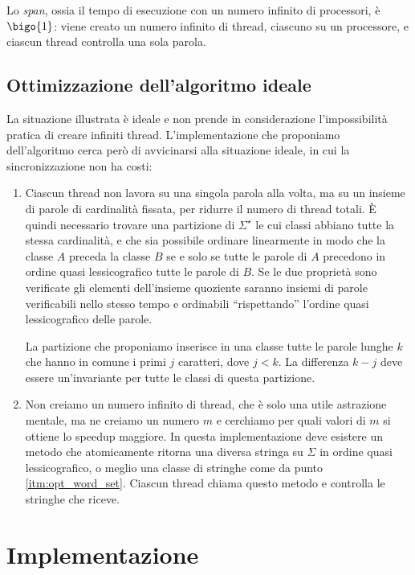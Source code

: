 \documentclass[]{myarticle}
\begin{document}
Lo \emph{span}, ossia il tempo di esecuzione con un numero infinito di processori, \`e $\bigo{1}$: viene creato un numero infinito di thread, ciascuno su un processore, e ciascun thread controlla una sola parola.

\subsection{Ottimizzazione dell'algoritmo ideale}

La situazione illustrata \`e ideale e non prende in considerazione l'impossibilit\`a pratica di creare infiniti thread.
L'implementazione che proponiamo dell'algoritmo cerca per\`o di avvicinarsi alla situazione ideale, in cui la sincronizzazione non ha costi:
\begin{enumerate}
	\item \label{itm:opt_word_set} Ciascun thread non lavora su una singola parola alla volta, ma su un insieme di parole di cardinalit\`a fissata, per ridurre il numero di thread totali.
		\`E quindi necessario trovare una partizione di $\Sigma^{\star}$ le cui classi abbiano tutte la stessa cardinalit\`a, e che sia possibile ordinare linearmente in modo che la classe $A$  preceda la classe $B$  se e solo se tutte le parole di $A$ precedono in ordine quasi lessicografico tutte le parole di $B$.
		Se le due propriet\`a sono verificate gli elementi dell'insieme quoziente saranno insiemi di parole verificabili nello stesso tempo e ordinabili ``rispettando'' l'ordine quasi lessicografico delle parole.

		La partizione che proponiamo inserisce in una classe tutte le parole lunghe $k$ che hanno in comune i primi $j$ caratteri, dove $j < k$.
		La differenza $k - j$ deve essere un'invariante per tutte le classi di questa partizione.
	\item Non creiamo un numero infinito di thread, che \`e solo una utile astrazione mentale, ma ne creiamo un numero $m$ e cerchiamo per quali valori di $m$ si ottiene lo speedup maggiore.
		In questa implementazione deve esistere un metodo che atomicamente ritorna una diversa stringa su $\Sigma$ in ordine quasi lessicografico, o meglio una classe di stringhe come da punto \ref{itm:opt_word_set}.
		Ciascun thread chiama questo metodo e controlla le stringhe che riceve.
\end{enumerate}

\section{Implementazione}
\end{document}
